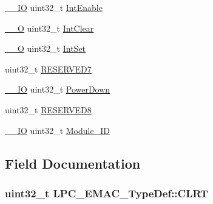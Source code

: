\begin{DoxyCompactItemize}
\item 
\hyperlink{LPC17xx_8h_aec43007d9998a0a0e01faede4133d6be}{\+\_\+\+\_\+\+IO} uint32\+\_\+t \hyperlink{structLPC__EMAC__TypeDef_aae7535bb7e025e32b0dd634680913213}{Int\+Enable}
\item 
\hyperlink{LPC17xx_8h_a7e25d9380f9ef903923964322e71f2f6}{\+\_\+\+\_\+O} uint32\+\_\+t \hyperlink{structLPC__EMAC__TypeDef_a4be5453f5e9866cf8067e190439b80fa}{Int\+Clear}
\item 
\hyperlink{LPC17xx_8h_a7e25d9380f9ef903923964322e71f2f6}{\+\_\+\+\_\+O} uint32\+\_\+t \hyperlink{structLPC__EMAC__TypeDef_a76b7ff34fd56db18a9d0bb47b20b55a3}{Int\+Set}
\item 
uint32\+\_\+t \hyperlink{structLPC__EMAC__TypeDef_a91dcc4dff1677e792e16381b8b57b9a0}{R\+E\+S\+E\+R\+V\+E\+D7}
\item 
\hyperlink{LPC17xx_8h_aec43007d9998a0a0e01faede4133d6be}{\+\_\+\+\_\+\+IO} uint32\+\_\+t \hyperlink{structLPC__EMAC__TypeDef_a190ca847cc0ab8f900f1180f97e85254}{Power\+Down}
\item 
uint32\+\_\+t \hyperlink{structLPC__EMAC__TypeDef_aed02e29f91e849b6a7d56697228a93c2}{R\+E\+S\+E\+R\+V\+E\+D8}
\item 
\hyperlink{LPC17xx_8h_aec43007d9998a0a0e01faede4133d6be}{\+\_\+\+\_\+\+IO} uint32\+\_\+t \hyperlink{structLPC__EMAC__TypeDef_a6ae4eea16f2d300e30ea89eb6f780ca5}{Module\+\_\+\+ID}
\end{DoxyCompactItemize}


\subsection{Field Documentation}
\subsubsection[{\texorpdfstring{C\+L\+RT}{CLRT}}]{ uint32\+\_\+t L\+P\+C\+\_\+\+E\+M\+A\+C\+\_\+\+Type\+Def\+::\+C\+L\+RT}\hypertarget{structLPC__EMAC__TypeDef_a3892dc5feb00ab5bb78954b83ae642c8}{}\label{structLPC__EMAC__TypeDef_a3892dc5feb00ab5bb78954b83ae642c8}
